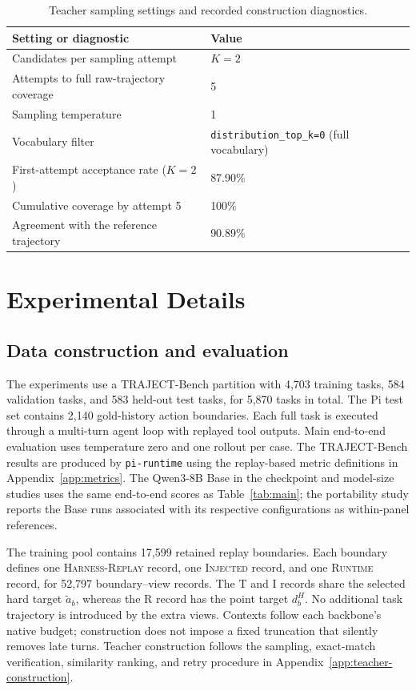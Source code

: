 \documentclass{article}
\newcommand{\replayaction}{\textsc{Harness-Replay}}
\newcommand{\injected}{\textsc{Injected}}
\newcommand{\runtime}{\textsc{Runtime}}
\begin{document}
\begin{table}[!htbp]
\centering
\small
\caption{Teacher sampling settings and recorded construction diagnostics.}
\label{tab:teacher-construction}
\begin{tabular}{@{}ll@{}}
\toprule
Setting or diagnostic & Value \\
\midrule
Candidates per sampling attempt & $K=2$ \\
Attempts to full raw-trajectory coverage & 5 \\
Sampling temperature & 1 \\
Vocabulary filter & \texttt{distribution\_top\_k=0} (full vocabulary) \\
First-attempt acceptance rate ($K=2$) & 87.90\% \\
Cumulative coverage by attempt 5 & 100\% \\
Agreement with the reference trajectory & 90.89\% \\
\bottomrule
\end{tabular}
\end{table}

\FloatBarrier
\section{Experimental Details}
\label{app:experimental-details}

\subsection{Data construction and evaluation}

The experiments use a TRAJECT-Bench partition \citep{he2026trajectbench}
with 4,703 training tasks, 584 validation tasks, and 583 held-out test tasks,
for 5,870 tasks in total. The Pi test set contains 2,140
gold-history action boundaries. Each full task is executed through a multi-turn
agent loop with replayed tool outputs. Main end-to-end evaluation uses temperature
zero and one rollout per case. The TRAJECT-Bench results are produced by
\texttt{pi-runtime} using the replay-based metric definitions in
Appendix~\ref{app:metrics}. The Qwen3-8B Base in the checkpoint and model-size
studies uses the same end-to-end scores as Table~\ref{tab:main}; the portability study reports the Base runs
associated with its respective configurations as within-panel references.

The training pool contains 17,599 retained replay boundaries. Each boundary
defines one \replayaction{} record, one \injected{} record, and one \runtime{}
record, for 52,797 boundary--view records. The T and I records share the selected
hard target $\tilde a_b$, whereas the R record has the point target $d_b^H$.
No additional task trajectory is introduced by the extra views. Contexts follow
each backbone's native budget; construction does not impose a fixed truncation
that silently removes late turns. Teacher construction follows the sampling,
exact-match verification, similarity ranking, and retry procedure in
Appendix~\ref{app:teacher-construction}.
\end{document}
